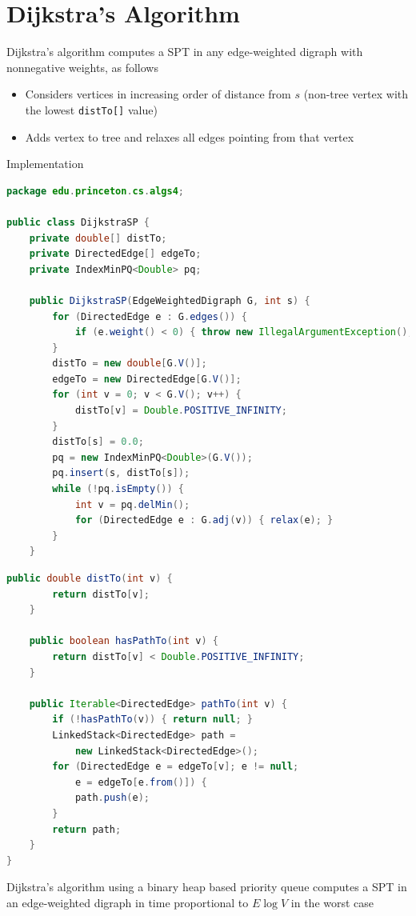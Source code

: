 \documentclass[8pt,a4paper,compress]{beamer}
\begin{document}
\section{Dijkstra's Algorithm}
\begin{frame}[fragile]
\pause

Dijkstra's algorithm computes a SPT in any edge-weighted
digraph with nonnegative weights, as follows

\begin{itemize}
\item Considers vertices in increasing order of distance from $s$ (non-tree vertex with the lowest \lstinline{distTo[]} value)
\item Adds vertex to tree and relaxes all edges pointing from that vertex
\end{itemize}

\pause
\bigskip

Implementation
\begin{lstlisting}[language=Java]
package edu.princeton.cs.algs4;

public class DijkstraSP {
    private double[] distTo; 
    private DirectedEdge[] edgeTo; 
    private IndexMinPQ<Double> pq; 
    
    public DijkstraSP(EdgeWeightedDigraph G, int s) {
        for (DirectedEdge e : G.edges()) {
            if (e.weight() < 0) { throw new IllegalArgumentException(); }
        }
        distTo = new double[G.V()];
        edgeTo = new DirectedEdge[G.V()];
        for (int v = 0; v < G.V(); v++) { 
            distTo[v] = Double.POSITIVE_INFINITY; 
        }
        distTo[s] = 0.0;
        pq = new IndexMinPQ<Double>(G.V());
        pq.insert(s, distTo[s]);
        while (!pq.isEmpty()) {
            int v = pq.delMin();
            for (DirectedEdge e : G.adj(v)) { relax(e); }
        }
    }    
\end{lstlisting}
\end{frame}

\begin{frame}[fragile]
\pause

\begin{lstlisting}[language=Java]
    public double distTo(int v) { 
        return distTo[v]; 
    }

    public boolean hasPathTo(int v) { 
        return distTo[v] < Double.POSITIVE_INFINITY; 
    }
    
    public Iterable<DirectedEdge> pathTo(int v) {
        if (!hasPathTo(v)) { return null; }
        LinkedStack<DirectedEdge> path = 
            new LinkedStack<DirectedEdge>();
        for (DirectedEdge e = edgeTo[v]; e != null; 
            e = edgeTo[e.from()]) {
            path.push(e);
        }
        return path;
    }
}
\end{lstlisting}

\pause
\bigskip

Dijkstra's algorithm using a binary heap based priority queue computes a SPT in an edge-weighted digraph in time proportional to $E\log V$ in the worst case
\end{frame}
\end{document}
